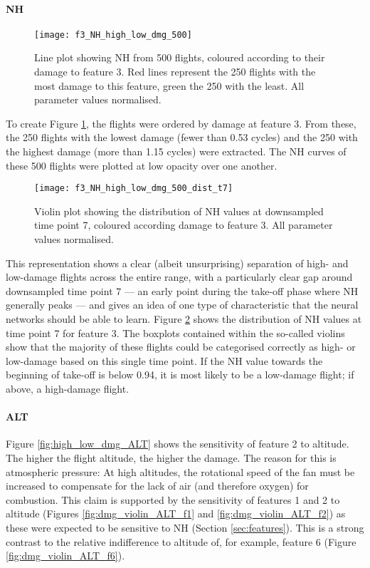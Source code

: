 \paragraph*{NH} \label{sec:data:nh}
\begin{figure}
    \centering
    \texttt{[image: f3\_NH\_high\_low\_dmg\_500]}
    \caption{\label{fig:high_low_dmg_NH} Line plot showing NH from 500 flights, coloured according to their damage to feature 3. Red lines represent the 250 flights with the most damage to this feature, green the 250 with the least. All parameter values normalised.}
\end{figure}

To create Figure \ref{fig:high_low_dmg_NH}, the flights were ordered by damage at feature 3. From these, the 250 flights with the lowest damage (fewer than 0.53 cycles) and the 250 with the highest damage (more than 1.15 cycles) were extracted. The NH curves of these 500 flights were plotted at low opacity over one another.

\begin{figure}
    \centering
    \texttt{[image: f3\_NH\_high\_low\_dmg\_500\_dist\_t7]}
    \caption{\label{fig:dmg_violin_NH} Violin plot showing the distribution of NH values at downsampled time point 7, coloured according damage to feature 3. All parameter values normalised.}
\end{figure}

This representation shows a clear (albeit unsurprising) separation of high- and low-damage flights across the entire range, with a particularly clear gap around downsampled time point 7 --- an early point during the take-off phase where NH generally peaks --- and gives an idea of one type of characteristic that the neural networks should be able to learn. Figure \ref{fig:dmg_violin_NH} shows the distribution of NH values at time point 7 for feature 3. The boxplots contained within the so-called violins show that the majority of these flights could be categorised correctly as high- or low-damage based on this single time point. If the NH value towards the beginning of take-off is below 0.94, it is most likely to be a low-damage flight; if above, a high-damage flight.

\paragraph*{ALT}
Figure \ref{fig:high_low_dmg_ALT} shows the sensitivity of feature 2 to altitude. The higher the flight altitude, the higher the damage. The reason for this is atmospheric pressure: At high altitudes, the rotational speed of the fan must be increased to compensate for the lack of air (and therefore oxygen) for combustion. This claim is supported by the sensitivity of features 1 and 2 to altitude (Figures \ref{fig:dmg_violin_ALT_f1} and \ref{fig:dmg_violin_ALT_f2}) as these were expected to be sensitive to NH (Section \ref{sec:features}). This is a strong contrast to the relative indifference to altitude of, for example, feature 6 (Figure \ref{fig:dmg_violin_ALT_f6}).

